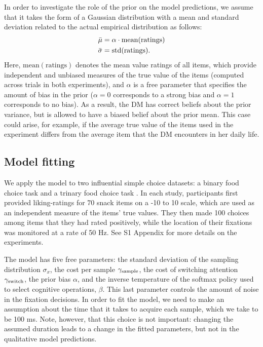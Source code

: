 In order to investigate the role of the prior on the model predictions, we assume that it takes the form of a Gaussian distribution with a mean and standard deviation related to the actual empirical distribution as follows:
\begin{equation}
\begin{aligned}
  \bar{\mu} &= \alpha \cdot \operatorname{mean}(\mathrm{ratings})\\
  \bar{\sigma} &= \operatorname{std}(\mathrm{ratings}).
\end{aligned}
\end{equation}
Here, $\mathrm{mean(ratings)}$ denotes the mean value ratings of all items, which provide independent and unbiased measures of the true value of the items (computed across trials in both experiments), and $\alpha$ is a free parameter that specifies the amount of bias in the prior ($\alpha=0$ corresponds to a strong bias and $\alpha=1$ corresponds to no bias). As a result, the DM has correct beliefs about the prior variance, but is allowed to have a biased belief about the prior mean. This case could arise, for example, if the average true value of the items used in the experiment differs from the average item that the DM encounters in her daily life. 




\subsection{Model fitting}
We apply the model to two influential simple choice datasets: a binary food choice task \citep{krajbich2010visual} and a trinary food choice task \citep{krajbich2011multialternative}. In each study, participants first provided liking-ratings for 70 snack items on a -10 to 10 scale, which are used as an independent measure of the items' true values. They then made 100 choices among items that they had rated positively, while the location of their fixations was monitored at a rate of 50 Hz. See S1 Appendix for more details on the experiments.


The model has five free parameters: the standard deviation of the sampling distribution $\sigma_{x}$, the cost per sample $\gamma_\text{sample}$, the cost of switching attention $\gamma_\text{switch}$, the prior bias $\alpha$, and the inverse temperature of the softmax policy used to select cognitive operations, $\beta$. This last parameter controls the amount of noise in the fixation decisions.  In order to fit the model, we need to make an assumption about the time that it takes to acquire each sample, which we take to be 100 ms. Note, however, that this choice is not important: changing the assumed duration leads to a change in the fitted parameters, but not in the qualitative model predictions.

